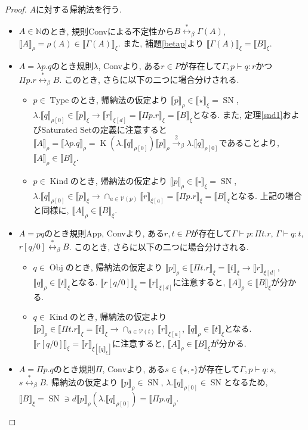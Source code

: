 \documentclass[12pt, titlepage]{ltjsarticle}
\DeclareMathOperator{\SN}{SN}
\DeclareMathOperator{\Obj}{Obj}
\DeclareMathOperator{\Type}{Type}
\DeclareMathOperator{\Kind}{Kind}
\DeclareMathOperator{\K}{K}
\newcommand{\iprt}[2]{\llbracket {#1} \rrbracket_ {#2}}
\begin{document}
\begin{proof}
 $A$に対する帰納法を行う.
 \begin{itemize}
  \item $A \in \mathbb{N}$のとき, 規則Convによる不定性から$B \overset{*}{\leftrightarrow}_\beta \Gamma(A)$, $\iprt{A}{\rho} = \rho (A) \in \iprt{\Gamma(A)}{\xi}$.
        また, 補題\ref{betap}より $\iprt{\Gamma(A)}{\xi} = \iprt{B}{\xi}$.
  \item $A = \lambda p. q$のとき規則$\lambda$, Convより, ある$r \in P$が存在して$\Gamma, p \vdash q \colon r$かつ$\Pi p. r \overset{*}{\leftrightarrow}_\beta B$. このとき, さらに以下の二つに場合分けされる.
 \begin{itemize}
  \item $p \in \Type$のとき, 帰納法の仮定より $\iprt{p}{\rho} \in \iprt{\star}{\xi} = \SN$, $\lambda . \iprt{q}{\rho[0]} \in \iprt{p}{\xi} \rightarrow \iprt{r}{\xi[d]} = \iprt{\Pi p. r}{\xi} = \iprt{B}{\xi}$となる.
        また, 定理\ref{snd1}およびSaturated Setの定義に注意すると$\iprt{A}{\rho} = \iprt{\lambda p. q}{\rho} = \K (\lambda . \iprt{q}{\rho[0]}) \iprt{p}{\rho} \overset{2}{\rightarrow}_\beta \lambda . \iprt{q}{\rho[0]}$であることより, $\iprt{A}{\rho} \in \iprt{B}{\xi}$.
  \item $p \in \Kind$のとき, 帰納法の仮定より $\iprt{p}{\rho} \in \iprt{\square}{\xi} = \SN$, $\lambda . \iprt{q}{\rho[0]} \in \iprt{p}{\xi} \rightarrow \cap_{a \in \mathcal{V}(p)} \iprt{r}{\xi[a]} = \iprt{\Pi p. r}{\xi} = \iprt{B}{\xi}$となる.
        上記の場合と同様に, $\iprt{A}{\rho} \in \iprt{B}{\xi}$.
 \end{itemize}
  \item $A = p q$のとき規則App, Convより, ある$r, t \in P$が存在して$\Gamma \vdash p \colon \Pi t. r$, $\Gamma \vdash q \colon t$, $r[q/0] \overset{*}{\leftrightarrow}_\beta B$. このとき, さらに以下の二つに場合分けされる.
 \begin{itemize}
  \item $q \in \Obj$のとき, 帰納法の仮定より $\iprt{p}{\rho} \in \iprt{\Pi t. r}{\xi} = \iprt{t}{\xi} \rightarrow \iprt{r}{\xi[d]}$, $\iprt{q}{\rho} \in \iprt{t}{\xi}$となる. $\iprt{r[q/0]}{\xi} = \iprt{r}{\xi[d]}$に注意すると, $\iprt{A}{\rho} \in \iprt{B}{\xi}$が分かる.
  \item $q \in \Kind$のとき, 帰納法の仮定より $\iprt{p}{\rho} \in \iprt{\Pi t. r}{\xi} = \iprt{t}{\xi} \rightarrow \cap_{a \in \mathcal{V}(t)} \iprt{r}{\xi[a]}$, $\iprt{q}{\rho} \in \iprt{t}{\xi}$となる. $\iprt{r[q/0]}{\xi} = \iprt{r}{\xi[\iprt{q}{\xi}]}$に注意すると, $\iprt{A}{\rho} \in \iprt{B}{\xi}$が分かる.
 \end{itemize}
  \item $A = \Pi p. q$のとき規則$\Pi$, Convより, ある$s \in \{ \star, \square \}$が存在して$\Gamma, p \vdash q \colon s$, $s \overset{*}{\leftrightarrow}_\beta B$. 帰納法の仮定より $\iprt{p}{\rho} \in \SN$, $\lambda. \iprt{q}{\rho[0]} \in \SN$となるため, $\iprt{B}{\xi} = \SN \ni d \iprt{p}{\rho} (\lambda. \iprt{q}{\rho[0]}) = \iprt{\Pi p. q}{\rho}$.
 \end{itemize}
\end{proof}
\end{document}

